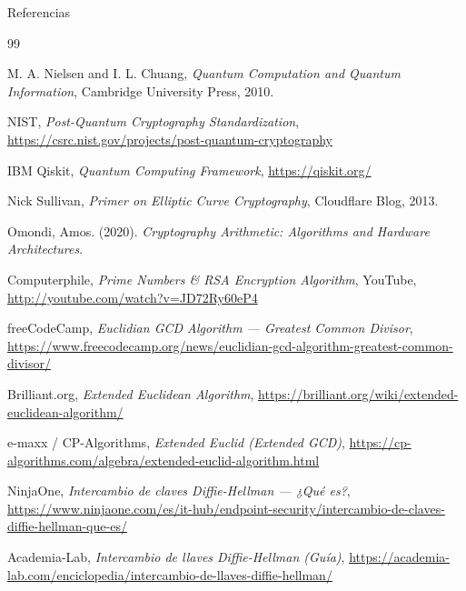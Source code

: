 \documentclass[aspectratio=169]{beamer}
\begin{document}
\begin{frame}[allowframebreaks]{Referencias}
\scriptsize
\raggedright

\begin{thebibliography}{99}

M. A. Nielsen and I. L. Chuang,
\textit{Quantum Computation and Quantum Information},
Cambridge University Press, 2010.

NIST,
\textit{Post-Quantum Cryptography Standardization},
\url{https://csrc.nist.gov/projects/post-quantum-cryptography}

IBM Qiskit,
\textit{Quantum Computing Framework},
\url{https://qiskit.org/}

Nick Sullivan,
\textit{Primer on Elliptic Curve Cryptography},
Cloudflare Blog, 2013.


Omondi, Amos. (2020). \textit{Cryptography Arithmetic: Algorithms and Hardware Architectures}.

Computerphile, \textit{Prime Numbers \& RSA Encryption Algorithm}, YouTube, \url{http://youtube.com/watch?v=JD72Ry60eP4}

freeCodeCamp, \textit{Euclidian GCD Algorithm — Greatest Common Divisor}, \url{https://www.freecodecamp.org/news/euclidian-gcd-algorithm-greatest-common-divisor/}

Brilliant.org, \textit{Extended Euclidean Algorithm}, \url{https://brilliant.org/wiki/extended-euclidean-algorithm/}

e-maxx / CP-Algorithms, \textit{Extended Euclid (Extended GCD)}, \url{https://cp-algorithms.com/algebra/extended-euclid-algorithm.html}

NinjaOne, \textit{Intercambio de claves Diffie-Hellman — ¿Qué es?}, \url{https://www.ninjaone.com/es/it-hub/endpoint-security/intercambio-de-claves-diffie-hellman-que-es/}

Academia-Lab, \textit{Intercambio de llaves Diffie-Hellman (Guía)}, \url{https://academia-lab.com/enciclopedia/intercambio-de-llaves-diffie-hellman/}

\end{thebibliography}
\end{frame}
\end{document}
